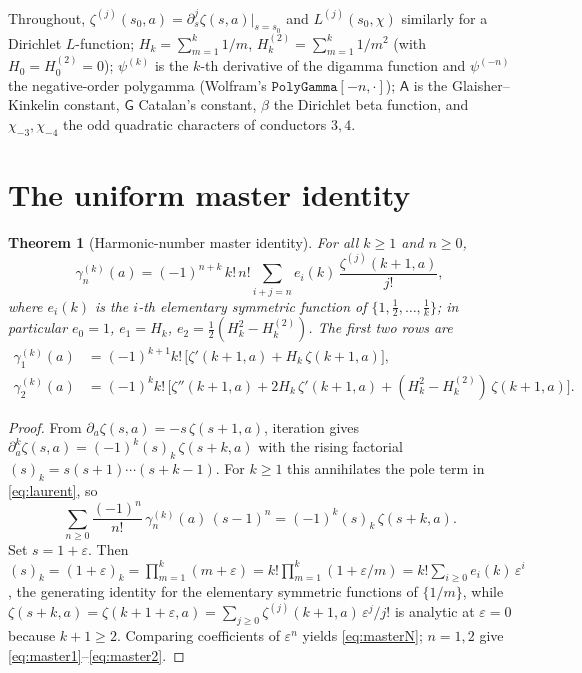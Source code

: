 \documentclass[11pt]{article}
\newtheorem{theorem}{Theorem}[section]
\theoremstyle{remark}
\newcommand{\Glaisher}{\mathsf{A}}
\newcommand{\Cat}{\mathsf{G}}
\newcommand{\h}[1]{H_{#1}}
\newcommand{\chim}[1]{\chi_{-#1}}
\begin{document}
Throughout, $\zeta^{(j)}(s_0,a)=\partial_s^j\zeta(s,a)\big|_{s=s_0}$ and
$L^{(j)}(s_0,\chi)$ similarly for a Dirichlet $L$-function; $\h{k}=\sum_{m=1}^k
1/m$, $\h{k}^{(2)}=\sum_{m=1}^k 1/m^2$ (with $\h0=\h0^{(2)}=0$); $\psi^{(k)}$ is
the $k$-th derivative of the digamma function and $\psi^{(-n)}$ the
negative-order polygamma (Wolfram's $\texttt{PolyGamma}[-n,\cdot]$); $\Glaisher$
is the Glaisher--Kinkelin constant, $\Cat$ Catalan's constant, $\beta$ the
Dirichlet beta function, and $\chim3,\chim4$ the odd quadratic characters of
conductors $3,4$.

\section{The uniform master identity}\label{sec:master}

\begin{theorem}[Harmonic-number master identity]\label{thm:master}
For all $k\ge1$ and $n\ge0$,
\begin{equation}\label{eq:masterN}
  \gamma_n^{(k)}(a)=(-1)^{n+k}\,k!\,n!\sum_{i+j=n} e_i(k)\,
   \frac{\zeta^{(j)}(k{+}1,a)}{j!},
\end{equation}
where $e_i(k)$ is the $i$-th elementary symmetric function of
$\{1,\tfrac12,\dots,\tfrac1k\}$; in particular $e_0=1$, $e_1=\h{k}$,
$e_2=\tfrac12(\h{k}^2-\h{k}^{(2)})$. The first two rows are
\begin{align}
  \gamma_1^{(k)}(a)&=(-1)^{k+1}k!\,\bigl[\zeta'(k{+}1,a)+\h{k}\,\zeta(k{+}1,a)\bigr],
   \label{eq:master1}\\
  \gamma_2^{(k)}(a)&=(-1)^{k}k!\,\bigl[\zeta''(k{+}1,a)+2\h{k}\,\zeta'(k{+}1,a)
   +(\h{k}^2-\h{k}^{(2)})\,\zeta(k{+}1,a)\bigr].\label{eq:master2}
\end{align}
\end{theorem}

\begin{proof}
From $\partial_a\zeta(s,a)=-s\,\zeta(s{+}1,a)$, iteration gives
$\partial_a^k\zeta(s,a)=(-1)^k (s)_k\,\zeta(s{+}k,a)$ with the rising factorial
$(s)_k=s(s{+}1)\cdots(s{+}k{-}1)$. For $k\ge1$ this annihilates the pole term in
\eqref{eq:laurent}, so
\[
  \sum_{n\ge0}\frac{(-1)^n}{n!}\,\gamma_n^{(k)}(a)\,(s-1)^n
   =(-1)^k(s)_k\,\zeta(s{+}k,a).
\]
Set $s=1+\varepsilon$. Then
$(s)_k=(1+\varepsilon)_k=\prod_{m=1}^k(m+\varepsilon)=k!\prod_{m=1}^k(1+\varepsilon/m)
 =k!\sum_{i\ge0}e_i(k)\,\varepsilon^i$,
the generating identity for the elementary symmetric functions of $\{1/m\}$,
while $\zeta(s{+}k,a)=\zeta(k{+}1{+}\varepsilon,a)=\sum_{j\ge0}\zeta^{(j)}(k{+}1,a)\,\varepsilon^j/j!$
is analytic at $\varepsilon=0$ because $k{+}1\ge2$. Comparing coefficients of
$\varepsilon^n$ yields \eqref{eq:masterN}; $n=1,2$ give
\eqref{eq:master1}--\eqref{eq:master2}.
\end{proof}
\end{document}
